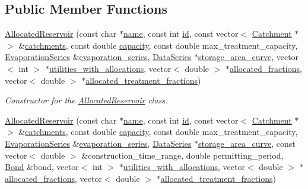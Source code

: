 \subsection*{Public Member Functions}
\begin{DoxyCompactItemize}
\item 
\mbox{\hyperlink{classAllocatedReservoir_a0b2d620a1d1fe9a9fe053269f35a9a70}{Allocated\+Reservoir}} (const char $\ast$\mbox{\hyperlink{classWaterSource_a846ea74c5b453d014f594d41fee8c765}{name}}, const int \mbox{\hyperlink{classWaterSource_a6eafe5dfefd317877d1244e8a7c6e742}{id}}, const vector$<$ \mbox{\hyperlink{classCatchment}{Catchment}} $\ast$$>$ \&\mbox{\hyperlink{classWaterSource_a8c18c34f23f8a06685c1d12f462ed830}{catchments}}, const double \mbox{\hyperlink{classWaterSource_a2ec257b415b248214a8bce7fc5267723}{capacity}}, const double max\+\_\+treatment\+\_\+capacity, \mbox{\hyperlink{classEvaporationSeries}{Evaporation\+Series}} \&\mbox{\hyperlink{classReservoir_a2d2d9b302c13703309bb798d24136810}{evaporation\+\_\+series}}, \mbox{\hyperlink{classDataSeries}{Data\+Series}} $\ast$\mbox{\hyperlink{classReservoir_a46bd5b750963dfa9a57b247fd77ab8ff}{storage\+\_\+area\+\_\+curve}}, vector$<$ int $>$ $\ast$\mbox{\hyperlink{classWaterSource_ac345583fc2d0f7e1db31ee40244d7ace}{utilities\+\_\+with\+\_\+allocations}}, vector$<$ double $>$ $\ast$\mbox{\hyperlink{classWaterSource_a2f6655a80c4847fe039987255d9d998c}{allocated\+\_\+fractions}}, vector$<$ double $>$ $\ast$\mbox{\hyperlink{classWaterSource_aa73fe10cfc6579b2fb79529e1dde5140}{allocated\+\_\+treatment\+\_\+fractions}})
\begin{DoxyCompactList}\small\item\em Constructor for the \mbox{\hyperlink{classAllocatedReservoir}{Allocated\+Reservoir}} class. \end{DoxyCompactList}\item 
\mbox{\hyperlink{classAllocatedReservoir_a22794afc1f06d13fc3099015a2250b0d}{Allocated\+Reservoir}} (const char $\ast$\mbox{\hyperlink{classWaterSource_a846ea74c5b453d014f594d41fee8c765}{name}}, const int \mbox{\hyperlink{classWaterSource_a6eafe5dfefd317877d1244e8a7c6e742}{id}}, const vector$<$ \mbox{\hyperlink{classCatchment}{Catchment}} $\ast$$>$ \&\mbox{\hyperlink{classWaterSource_a8c18c34f23f8a06685c1d12f462ed830}{catchments}}, const double \mbox{\hyperlink{classWaterSource_a2ec257b415b248214a8bce7fc5267723}{capacity}}, const double max\+\_\+treatment\+\_\+capacity, \mbox{\hyperlink{classEvaporationSeries}{Evaporation\+Series}} \&\mbox{\hyperlink{classReservoir_a2d2d9b302c13703309bb798d24136810}{evaporation\+\_\+series}}, \mbox{\hyperlink{classDataSeries}{Data\+Series}} $\ast$\mbox{\hyperlink{classReservoir_a46bd5b750963dfa9a57b247fd77ab8ff}{storage\+\_\+area\+\_\+curve}}, const vector$<$ double $>$ \&construction\+\_\+time\+\_\+range, double permitting\+\_\+period, \mbox{\hyperlink{classBond}{Bond}} \&bond, vector$<$ int $>$ $\ast$\mbox{\hyperlink{classWaterSource_ac345583fc2d0f7e1db31ee40244d7ace}{utilities\+\_\+with\+\_\+allocations}}, vector$<$ double $>$ $\ast$\mbox{\hyperlink{classWaterSource_a2f6655a80c4847fe039987255d9d998c}{allocated\+\_\+fractions}}, vector$<$ double $>$ $\ast$\mbox{\hyperlink{classWaterSource_aa73fe10cfc6579b2fb79529e1dde5140}{allocated\+\_\+treatment\+\_\+fractions}})

\end{DoxyCompactItemize}
